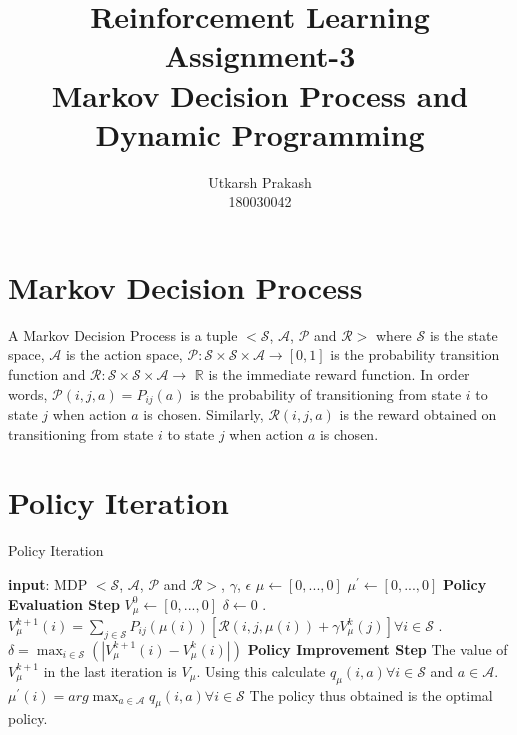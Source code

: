 \documentclass{article}
\title{Reinforcement Learning Assignment-3 \\
	\Large Markov Decision Process and Dynamic Programming \\}
\begin{document}
\author{Utkarsh Prakash \\ \normalsize 180030042}
\maketitle
\section{Markov Decision Process}
A Markov Decision Process is a tuple $<\mathcal{S}$, $\mathcal{A}$, $\mathcal{P}$ and $\mathcal{R}>$ where $\mathcal{S}$ is the state space,
$\mathcal{A}$ is the action space, $\mathcal{P} : \mathcal{S} \times \mathcal{S} \times \mathcal{A} \rightarrow [0, 1]$ is the probability transition
function and $\mathcal{R} : \mathcal{S} \times \mathcal{S} \times \mathcal{A} \rightarrow$ $\mathbb{R}$ is the immediate reward function.
In order words, $\mathcal{P}(i, j, a) = P_{ij}(a)$ is the probability of transitioning from state $i$ to state $j$ when action $a$ is chosen.
Similarly, $\mathcal{R}(i, j, a)$ is the reward obtained on transitioning from state $i$ to state $j$ when action $a$ is chosen.

\section{Policy Iteration}
    \begin{algorithm}
        \caption{Policy Iteration}\label{policy_iteration}
        \begin{algorithmic}
            \State \textbf{input}: MDP $<\mathcal{S}$, $\mathcal{A}$, $\mathcal{P}$ and $\mathcal{R}>$, $\gamma$, $\epsilon$
            \State $\mu \gets [0,..., 0]$ 
            \State $\mu^{'} \gets [0,..., 0]$ 
                \State
                \State \textbf{Policy Evaluation Step}
                \State $V^{0}_{\mu} \gets [0,..., 0]$
                \State $\delta \gets 0$
                \While{$\delta >= \epsilon$}
                    . $V^{k+1}_{\mu}(i) = \sum_{j \in \mathcal{S}} P_{ij}(\mu(i)) [\mathcal{R}(i, j, \mu(i)) + \gamma V^{k}_{\mu}(j)] \forall i \in \mathcal{S}$
                    . $\delta = \max_{i \in \mathcal{S}}(|V^{k+1}_{\mu}(i) - V^{k}_{\mu}(i)|)$
                \EndWhile
                \State 
                \State \textbf{Policy Improvement Step}
                \State The value of $V^{k+1}_{\mu}$ in the last iteration is $V_{\mu}$. Using this calculate $q_{\mu}(i, a) \forall i \in \mathcal{S}$ and $a \in \mathcal{A}$.
                \State $\mu^{'}(i) = arg \max_{a \in \mathcal{A}} q_{\mu}(i, a) \forall i \in \mathcal{S}$
            \EndWhile
            \State The policy thus obtained is the optimal policy.
        \end{algorithmic}
    \end{algorithm}
\end{document}
